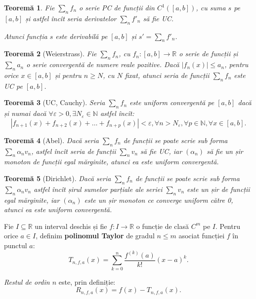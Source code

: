 \documentclass[11pt,a4paper]{article}
\newcommand\seq{\subseteq}
\newcommand\NN{\mathbb{N}}
\newcommand\RR{\mathbb{R}}
\theoremstyle{dotless}
\newtheorem{theorem}{Teorem\u{a}}[section]
\theoremstyle{dotlessdr}
\begin{document}
\begin{theorem}\label{thm:uc-der}
  Fie $\sum_n f_n$ o serie PC de funcții din $C^1([a,b])$, cu suma $s$ pe $[a, b]$
  și astfel încît seria derivatelor $\sum_n f'_n$ să fie UC.

  Atunci funcția $s$ este derivabilă pe $[a, b]$ și $s' = \sum_n f'_n$.
\end{theorem}

\begin{theorem}[Weierstrass]\label{thm:weierstrass}
  Fie $\sum_n f_n$, cu $f_n : [a, b] \to \RR$ o serie de funcții și $\sum_n a_n$
  o serie convergentă de numere reale pozitive. Dacă $|f_n(x)| \leq a_n$, pentru
  orice $x \in [a, b]$ și pentru $n \geq N$, cu $N$ fixat, atunci seria de funcții
  $\sum_n f_n$ este UC pe $[a, b]$.
\end{theorem}

\begin{theorem}[UC, Cauchy]\label{thm:uc-cauchy}
  Seria $\sum_n f_n$ este uniform convergentă pe $[a, b]$ dacă și numai dacă
  $\forall \varepsilon > 0, \exists N_\varepsilon \in \NN$ astfel încît:
  \[
    |f_{n+1}(x) + f_{n+2}(x) + \dots + f_{n+p}(x)| < \varepsilon, %
    \forall n > N_\varepsilon, \forall p \in \NN, \forall x \in [a, b].
  \]
\end{theorem}

\begin{theorem}[Abel]\label{thm:abel}
  Dacă seria $\sum_n f_n$ de funcții se poate scrie sub forma $\sum_n \alpha_n v_n$,
  astfel încît seria de funcții $\sum_n v_n$ să fie UC, iar $(\alpha_n)$ să fie
  un șir monoton de funcții egal mărginite, atunci ea este uniform convergentă.
\end{theorem}

\begin{theorem}[Dirichlet]\label{thm:dirichlet}
  Dacă seria $\sum_n f_n$ de funcții se poate scrie sub forma $\sum_n \alpha_n v_n$
  astfel încît șirul sumelor parțiale ale seriei $\sum_n v_n$ este un șir
  de funcții egal mărginite, iar $(\alpha_n)$ este un șir monoton ce converge
  uniform către 0, atunci ea este uniform convergentă.
\end{theorem}

Fie $I \seq \RR$ un interval deschis și fie $f : I \to \RR$ o funcție de clasă
$C^m$ pe $I$. Pentru orice $a \in I$, definim \textbf{polinomul Taylor} de gradul
$n \leq m$ asociat funcției $f$ în punctul $a$:
\[
  T_{n, f, a}(x) = \sum_{k = 0}^n \frac{f^{(k)}(a)}{k!} (x - a)^k.
\]

\emph{Restul de ordin $n$} este, prin definiție:
\[
  R_{n, f, a}(x) = f(x) - T_{n, f, a}(x).
\]
\end{document}
